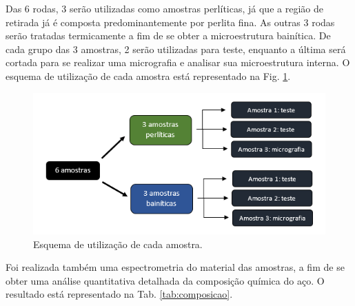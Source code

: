 \documentclass[
12pt,
openany, %
oneside, %
a4paper,			
english,			
brazil			        %
]{abntbibufjf}
\begin{document}
	Das 6 rodas, 3 serão utilizadas como amostras perlíticas, já que a região de retirada já é composta predominantemente por perlita fina. As outras 3 rodas serão tratadas termicamente a fim de se obter a microestrutura bainítica. De cada grupo das 3 amostras, 2 serão utilizadas para teste, enquanto a última será cortada para se realizar uma micrografia e analisar sua microestrutura interna. O esquema de utilização de cada amostra está representado na Fig. \ref{fig:amostras}.
	
	\begin{figure}[H]
		\centering
		\includegraphics[width=1\textwidth]{amostras}
		\caption{Esquema de utilização de cada amostra.}
		\label{fig:amostras}
	\end{figure}

	Foi realizada também uma espectrometria do material das amostras, a fim de se obter uma análise quantitativa detalhada da composição química do aço. O resultado está representado na Tab. \ref{tab:composicao}.
	
	\begin{table}[H]
	\centering
	\caption{Composição química das amostras via Espectrômetro de Emissão Óptica}
	\label{tab:composicao}%
	\end{table}%
\end{document}
